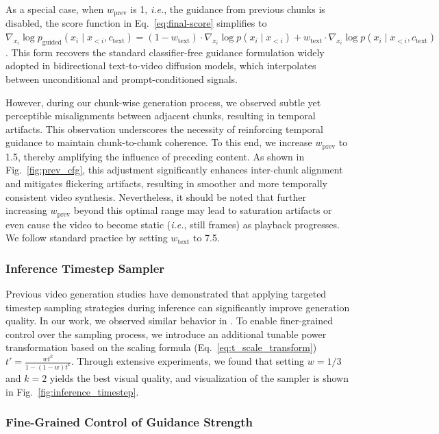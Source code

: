 As a special case, when \( w_{\text{prev}}\) is 1, \emph{i.e.}, the guidance from previous chunks is disabled, the score function in Eq.~\ref{eq:final-score} simplifies to \( \nabla_{x_i} \log p_{\text{guided}}(x_i \mid x_{<i}, c_{\text{text}}) = (1 - w_{\text{text}}) \cdot \nabla_{x_i} \log p(x_i \mid x_{<i}) + w_{\text{text}} \cdot \nabla_{x_i} \log p(x_i \mid x_{<i}, c_{\text{text}}) \). This form recovers the standard classifier-free guidance formulation widely adopted in bidirectional text-to-video diffusion models, which interpolates between unconditional and prompt-conditioned signals.

However, during our chunk-wise generation process, we observed subtle yet perceptible misalignments between adjacent chunks, resulting in temporal artifacts. This observation underscores the necessity of reinforcing temporal guidance to maintain chunk-to-chunk coherence. To this end, we increase \( w_{\text{prev}} \) to 1.5, thereby amplifying the influence of preceding content. As shown in Fig.~\ref{fig:prev_cfg}, this adjustment significantly enhances inter-chunk alignment and mitigates flickering artifacts, resulting in smoother and more temporally consistent video synthesis. Nevertheless, it should be noted that further increasing \( w_{\text{prev}} \) beyond this optimal range may lead to saturation artifacts or even cause the video to become static (\emph{i.e.}, still frames) as playback progresses. We follow standard practice by setting \( w_{\text{text}} \) to 7.5.


\subsubsection{Inference Timestep Sampler}
Previous video generation studies have demonstrated that applying targeted timestep sampling strategies during inference can significantly improve generation quality. In our work, we observed similar behavior in \magi. To enable finer-grained control over the sampling process, we introduce an additional tunable power transformation based on the scaling formula (Eq.~\ref{eq:t_scale_transform}) $t' = \frac{wt^k}{1-(1-w)t^k}$. Through extensive experiments, we found that setting $w = 1/3$ and $k = 2$ yields the best visual quality, and visualization of the sampler is shown in Fig.~\ref{fig:inference_timestep}.


\subsubsection{Fine-Grained Control of Guidance Strength}
